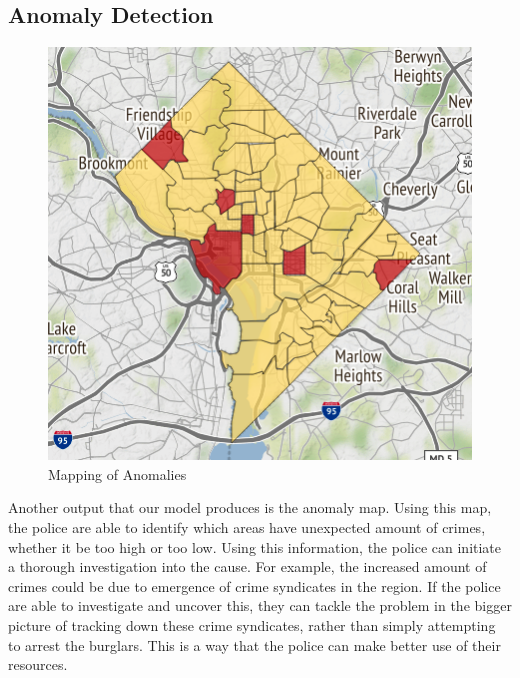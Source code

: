 \documentclass[letterpaper]{article}
\begin{document}
	\subsection{Anomaly Detection}
	\begin{figure}[!ht]
		\includegraphics[width=\linewidth]{./w22_outlier.png}
		\caption{Mapping of Anomalies}
		\label{p4}
	\end{figure}
	Another output that our model produces is the anomaly map. Using this map, the police are able to identify which areas have unexpected amount of crimes, whether it be too high or too low. Using this information, the police can initiate a thorough investigation into the cause. For example, the increased amount of crimes could be due to emergence of crime syndicates in the region. If the police are able to investigate and uncover this, they can tackle the problem in the bigger picture of tracking down these crime syndicates, rather than simply attempting to arrest the burglars. This is a way that the police can make better use of their resources.
\end{document}

